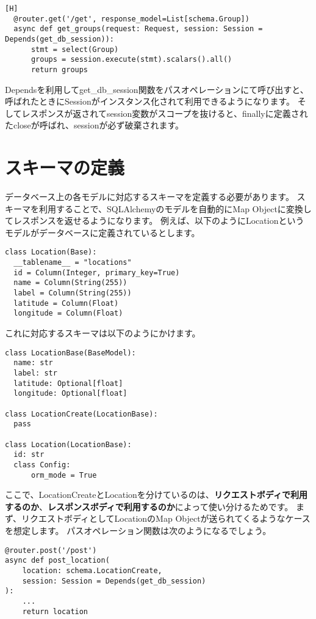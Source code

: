 \begin{lstlisting}[caption=パスオペレーション関数][H]
  @router.get('/get', response_model=List[schema.Group])
  async def get_groups(request: Request, session: Session = Depends(get_db_session)):
      stmt = select(Group)
      groups = session.execute(stmt).scalars().all()
      return groups
\end{lstlisting}

Dependsを利用してget\_db\_session関数をパスオペレーションにて呼び出すと、
呼ばれたときにSessionがインスタンス化されて利用できるようになります。
そしてレスポンスが返されてsession変数がスコープを抜けると、finallyに定義されたcloseが呼ばれ、sessionが必ず破棄されます。


\section{スキーマの定義}
データベース上の各モデルに対応するスキーマを定義する必要があります。
スキーマを利用することで、SQLAlchemyのモデルを自動的にMap Objectに変換してレスポンスを返せるようになります。
例えば、以下のようにLocationというモデルがデータベースに定義されているとします。

\begin{lstlisting}[caption=Location Model]
class Location(Base):
  __tablename__ = "locations"
  id = Column(Integer, primary_key=True)
  name = Column(String(255))
  label = Column(String(255))
  latitude = Column(Float)
  longitude = Column(Float)
\end{lstlisting}

これに対応するスキーマは以下のようにかけます。


\begin{lstlisting}[caption=Location schema]
class LocationBase(BaseModel):
  name: str
  label: str
  latitude: Optional[float]
  longitude: Optional[float]

class LocationCreate(LocationBase):
  pass

class Location(LocationBase):
  id: str
  class Config:
      orm_mode = True
\end{lstlisting}

ここで、LocationCreateとLocationを分けているのは、\textbf{リクエストボディで利用するのか}、\textbf{レスポンスボディで利用するのか}によって使い分けるためです。
まず、リクエストボディとしてLocationのMap Objectが送られてくるようなケースを想定します。
パスオペレーション関数は次のようになるでしょう。

\begin{lstlisting}[caption=Create New Location]
@router.post('/post')
async def post_location(
    location: schema.LocationCreate,
    session: Session = Depends(get_db_session)
):
    ...
    return location
\end{lstlisting}


